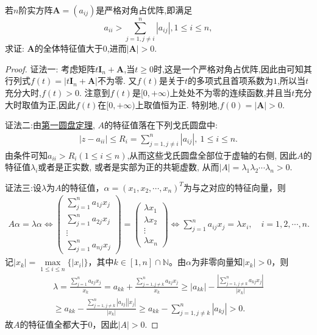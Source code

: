 \documentclass[../../main.tex]{subfiles}%
\begin{document}
\begin{proposition}\label{proposition:更严格对角占优阵行列式必大于零}
若\(n\)阶实方阵\(\boldsymbol{A}=(a_{ij})\)是严格对角占优阵,即满足
\[
a_{ii}>\sum_{j = 1,j\neq i}^{n}|a_{ij}|,1\leqslant  i\leqslant  n,
\]
求证: $\boldsymbol{A}$的全体特征值大于0,进而\(|\boldsymbol{A}|>0\).
\end{proposition}
\begin{proof}

{\color{blue}证法一:}
考虑矩阵\(t\boldsymbol{I}_n+\boldsymbol{A}\),当\(t\geqslant 0\)时,这是一个严格对角占优阵,因此由可知其行列式\(f(t)=|t\boldsymbol{I}_n+\boldsymbol{A}|\)不为零. 又\(f(t)\)是关于\(t\)的多项式且首项系数为\(1\),所以当\(t\)充分大时,\(f(t)>0\). 注意到\(f(t)\)是\([0,+\infty)\)上处处不为零的连续函数,并且当\(t\)充分大时取值为正,因此\(f(t)\)在\([0,+\infty)\)上取值恒为正. 特别地,\(f(0)=|\boldsymbol{A}|>0\).

{\color{blue}证法二:}由\hyperref[theorem:第一圆盘定理]{第一圆盘定理}, \(A\)的特征值落在下列戈氏圆盘中:
\begin{align*}
|z - a_{ii}| \leqslant  R_{i} = \sum_{j = 1,j\neq i}^{n}|a_{ij}|,\ 1 \leqslant  i \leqslant  n.
\end{align*}
由条件可知\(a_{ii} > R_{i}(1 \leqslant  i \leqslant  n)\),从而这些戈氏圆盘全部位于虚轴的右侧, 因此\(A\)的特征值\(\lambda_{i}\)或者是正实数, 或者是实部为正的共轭虚数, 从而\(|A|=\lambda_{1}\lambda_{2}\cdots\lambda_{n}>0\). 

{\color{blue}证法三:}设$\lambda$为$A$的特征值，$\alpha=(x_1,x_2,\cdots,x_n)^T$为与之对应的特征向量，则
\begin{align*}
A\alpha = \lambda\alpha \Longleftrightarrow \begin{pmatrix}
\sum_{j=1}^n a_{1j}x_j \\
\sum_{j=1}^n a_{2j}x_j \\
\vdots \\
\sum_{j=1}^n a_{nj}x_j
\end{pmatrix} = \begin{pmatrix}
\lambda x_1 \\
\lambda x_2 \\
\vdots \\
\lambda x_n
\end{pmatrix} \Longleftrightarrow \sum_{j=1}^n a_{ij}x_j = \lambda x_i,\quad i=1,2,\cdots,n.
\end{align*}
记$|x_k| = \max\limits_{1\leqslant i\leqslant n}\{|x_i|\}$，其中$k\in[1,n]\cap\mathbb{N}$。由$\alpha$为非零向量知$|x_k|>0$，则
\begin{align*}
\lambda = \frac{\sum\limits_{j=1}^n a_{kj}x_j}{x_k} = a_{kk} + \frac{\sum\limits_{j=1,j\ne k}^n a_{kj}x_j}{x_k} \geqslant |a_{kk}| - \frac{\left|\sum\limits_{j=1,j\ne k}^n a_{kj}x_j\right|}{|x_k|} \\
\geqslant a_{kk} - \frac{\sum\limits_{j=1,j\ne k}^n |a_{kj}||x_j|}{|x_k|} \geqslant a_{kk} - \sum\limits_{j=1,j\ne k}^n |a_{kj}| > 0.
\end{align*}
故$A$的特征值全都大于$0$，因此$|A|>0$.
\end{proof}
\end{document}
